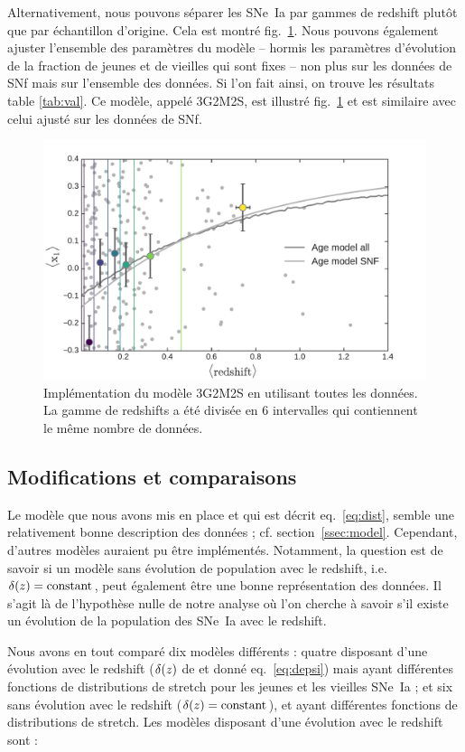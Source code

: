 \documentclass[a4paper, 12pt, svgnames]{article}
\begin{document}
Alternativement, nous pouvons séparer les SNe~Ia par gammes de redshift plutôt
que par échantillon d'origine. Cela est montré fig.~\ref{fig:3G2M2S}. Nous
pouvons également ajuster l'ensemble des paramètres du modèle -- hormis les
paramètres d'évolution de la fraction de jeunes et de vieilles qui sont fixes --
non plus sur les données de SNf mais sur l'ensemble des données. Si l'on fait
ainsi, on trouve les résultats table \ref{tab:val}. Ce modèle, appelé 3G2M2S,
est illustré fig.~\ref{fig:3G2M2S} et est similaire avec celui ajusté sur les
données de SNf.

\begin{figure}[htbp!]
    \centering
    \includegraphics[width=.7\linewidth]{Rapport_figures/model_all.pdf}
    \captionsetup{justification=centering}
    \caption{Implémentation du modèle 3G2M2S en utilisant toutes les données.
    La gamme de redshifts a été divisée en 6 intervalles qui contiennent le même
nombre de données.}
    \label{fig:3G2M2S}
\end{figure}

\subsection{Modifications et comparaisons}\label{ssec:comp}

Le modèle que nous avons mis en place et qui est décrit eq.~\ref{eq:dist},
semble une relativement bonne description des données ; cf.
section~\ref{ssec:model}. Cependant, d'autres modèles auraient pu être
implémentés. Notamment, la question est de savoir si un modèle sans évolution
de population avec le redshift, i.e. $\delta(z)=\mathrm{constant}$, peut également
être une bonne représentation des données. Il s'agit là de l'hypothèse nulle de
notre analyse où l'on cherche à savoir s'il existe un évolution de la population
des SNe~Ia avec le redshift. \bigbreak

Nous avons en tout comparé dix modèles différents : quatre disposant d'une
évolution avec le redshift ($\delta (z)$ de \cite{rigault_strong_2018} et donné
eq.~\ref{eq:depsi}) mais ayant différentes fonctions de distributions de stretch
pour les jeunes et les vieilles SNe~Ia ; et six sans évolution avec le redshift
($\delta(z)=\mathrm{constant}$), et ayant différentes fonctions de distributions de
stretch. Les modèles disposant d'une évolution avec le redshift sont :
\end{document}
